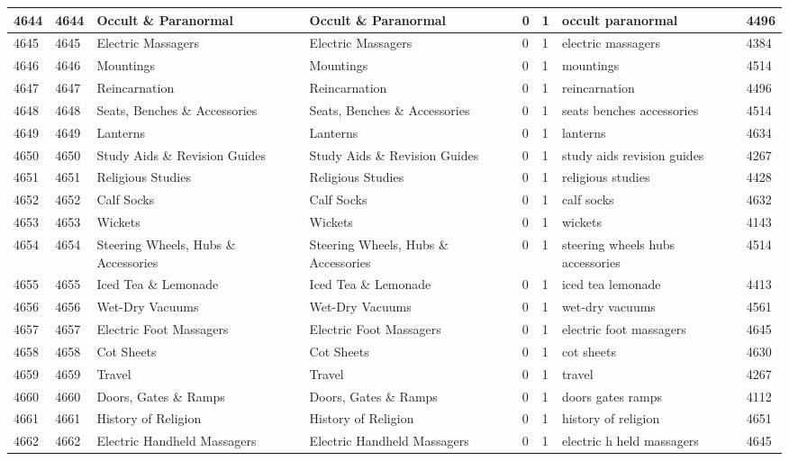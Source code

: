 \begin{longtable}{|l|l|l|l|l|l|l|l|}
4644 & 4644 & Occult \& Paranormal & Occult \& Paranormal & 0 & 1 & occult paranormal & 4496 \\ \hline 
4645 & 4645 & Electric Massagers & Electric Massagers & 0 & 1 & electric massagers & 4384 \\ \hline 
4646 & 4646 & Mountings & Mountings & 0 & 1 & mountings & 4514 \\ \hline 
4647 & 4647 & Reincarnation & Reincarnation & 0 & 1 & reincarnation & 4496 \\ \hline 
4648 & 4648 & Seats, Benches \& Accessories & Seats, Benches \& Accessories & 0 & 1 & seats benches accessories & 4514 \\ \hline 
4649 & 4649 & Lanterns & Lanterns & 0 & 1 & lanterns & 4634 \\ \hline 
4650 & 4650 & Study Aids \& Revision Guides & Study Aids \& Revision Guides & 0 & 1 & study aids revision guides & 4267 \\ \hline 
4651 & 4651 & Religious Studies & Religious Studies & 0 & 1 & religious studies & 4428 \\ \hline 
4652 & 4652 & Calf Socks & Calf Socks & 0 & 1 & calf socks & 4632 \\ \hline 
4653 & 4653 & Wickets & Wickets & 0 & 1 & wickets & 4143 \\ \hline 
4654 & 4654 & Steering Wheels, Hubs \& Accessories & Steering Wheels, Hubs \& Accessories & 0 & 1 & steering wheels hubs accessories & 4514 \\ \hline 
4655 & 4655 & Iced Tea \& Lemonade & Iced Tea \& Lemonade & 0 & 1 & iced tea lemonade & 4413 \\ \hline 
4656 & 4656 & Wet-Dry Vacuums & Wet-Dry Vacuums & 0 & 1 & wet-dry vacuums & 4561 \\ \hline 
4657 & 4657 & Electric Foot Massagers & Electric Foot Massagers & 0 & 1 & electric foot massagers & 4645 \\ \hline 
4658 & 4658 & Cot Sheets & Cot Sheets & 0 & 1 & cot sheets & 4630 \\ \hline 
4659 & 4659 & Travel & Travel & 0 & 1 & travel & 4267 \\ \hline 
4660 & 4660 & Doors, Gates \& Ramps & Doors, Gates \& Ramps & 0 & 1 & doors gates ramps & 4112 \\ \hline 
4661 & 4661 & History of Religion & History of Religion & 0 & 1 & history of religion & 4651 \\ \hline 
4662 & 4662 & Electric Handheld Massagers & Electric Handheld Massagers & 0 & 1 & electric h held massagers & 4645 \\ \hline 

\end{longtable}
